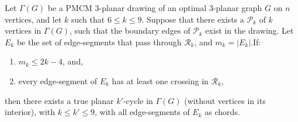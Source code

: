 \begin{lemma}\label{lem:3_planar_polygon}
Let $\Gamma(G)$ be a PMCM $3$-planar drawing of an optimal $3$-planar graph $G$ on $n$ vertices, and let $k$ such that $6\leq k\leq 9$. Suppose that there exists a \pp $\mathcal{P}_k$ of $k$ vertices in $\Gamma(G)$, such that the boundary edges of $\mathcal{P}_k$ exist in the drawing. Let $E_k$ be the set of edge-segments that pass through $\mathcal{R}_k$, and $m_k=|E_k|$.If: 
\begin{enumerate}
\item $m_k\leq 2k-4$, and, 
\item every edge-segment of $E_k$ has at least one crossing in $\mathcal{R}_k$,
\end{enumerate}
then there exists a true planar $k'$-cycle in $\Gamma(G)$ (without vertices in its interior), with $k\leq k'\leq 9$, with all edge-segments of $E_k$ as chords.
\end{lemma}

